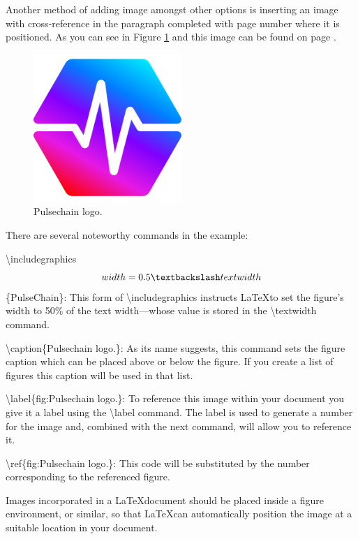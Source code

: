 \documentclass[12pt, letterpaper]{article}
\begin{document}
Another method of adding image amongst other options is inserting an image with cross-reference in the paragraph completed with page number where it is positioned. As you can see in Figure \ref{fig:Pulsechain logo.} and this image can be found on page \pageref{fig:Pulsechain logo.}.

\begin{figure}[h]
    \centering
    \includegraphics[width=0.5\textwidth]{PulseChain}
    \caption{Pulsechain logo.}
    \label{fig:Pulsechain logo.}
\end{figure}

There are several noteworthy commands in the example:

\textbackslash includegraphics\[width=0.5\textbackslash textwidth\]\{PulseChain\}: This form of \textbackslash includegraphics instructs \LaTeX to set the figure’s width to 50\% of the text width—whose value is stored in the \textbackslash textwidth command.

\textbackslash caption\{Pulsechain logo.\}: As its name suggests, this command sets the figure caption which can be placed above or below the figure. If you create a list of figures this caption will be used in that list.

\textbackslash label\{fig:Pulsechain logo.\}: To reference this image within your document you give it a label using the \textbackslash label command. The label is used to generate a number for the image and, combined with the next command, will allow you to reference it.

\textbackslash ref\{fig:Pulsechain logo.\}: This code will be substituted by the number corresponding to the referenced figure.

Images incorporated in a \LaTeX document should be placed inside a figure environment, or similar, so that \LaTeX  can automatically position the image at a suitable location in your document.
\end{document}
